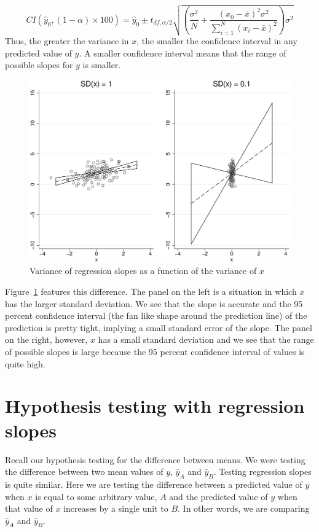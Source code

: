\begin{equation}
CI\left(\hat{y}_0,\left(1-\alpha\right)\times100\right)=\hat{y}_0\pm t_{df,\alpha/2}\sqrt{\left(\frac{\sigma^2}{N}+\frac{\left(x_0-\bar{x}\right)^2\sigma^2}{\sum_{i=1}^N\left(x_i-\bar{x}\right)^2}\right)\sigma^2}
\end{equation}
Thus, the greater the variance in $x$, the smaller the confidence interval in any predicted value of $y$. A smaller confidence interval means that the range of possible slopes for $y$ is smaller.
\begin{figure}
   \centering
   \includegraphics[angle=0,
           width=.75\textwidth]{cislope.eps}
   \caption{Variance of regression slopes as a function of the variance of $x$}
  \label{fig:cislopes}
\end{figure}
Figure~\ref{fig:cislopes} features this difference. The panel on the left is a situation in which $x$ has the larger standard deviation. We see that the slope is accurate and the 95 percent confidence interval (the fan like shape around the prediction line) of the prediction is pretty tight, implying a small standard error of the slope. The panel on the right, however, $x$ has a small standard deviation and we see that the range of possible slopes is large because the 95 percent confidence interval of values is quite high.
\section{Hypothesis testing with regression slopes}
Recall our hypothesis testing for the difference between means. We were testing the difference between two mean values of $y$, $\bar{y}_A$ and $\bar{y}_B$. Testing regression slopes is quite similar. Here we are testing the difference between a predicted value of $y$ when $x$ is equal to some arbitrary value, $A$ and the predicted value of $y$ when that value of $x$ increases by a single unit to $B$. In other words, we are comparing $\hat{y}_A$ and $\hat{y}_B$.

